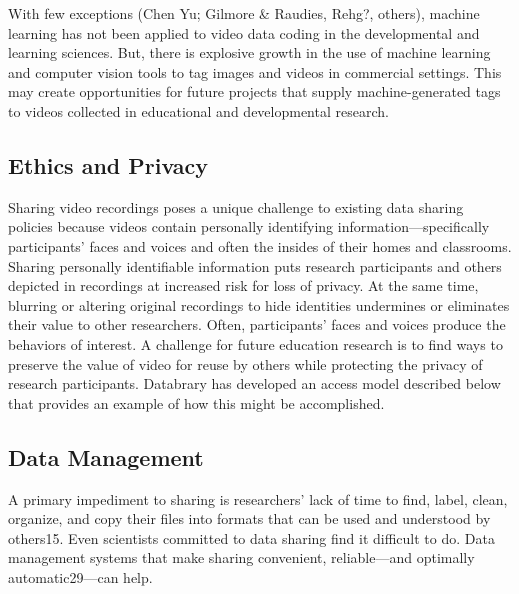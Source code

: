\documentclass[letterpaper,man,natbib]{apa6}
\begin{document}
With few exceptions (Chen Yu; Gilmore \& Raudies, Rehg?, others), machine learning has not been applied to video data coding in the developmental and learning sciences.
But, there is explosive growth in the use of machine learning and computer vision tools to tag images and videos in commercial settings.
This may create opportunities for future projects that supply machine-generated tags to videos collected in educational and developmental research.

\subsection{Ethics and Privacy}

Sharing video recordings poses a unique challenge to existing data sharing policies because videos contain personally identifying information—specifically participants’ faces and voices and often the
insides of their homes and classrooms. 
Sharing personally identifiable information puts research participants and others depicted in recordings at increased risk for loss of privacy. 
At the same time, blurring or altering original recordings to hide identities undermines or eliminates
their value to other researchers. 
Often, participants’ faces and voices produce the behaviors of interest.
A challenge for future education research is to find ways to preserve the value of video for reuse by others while protecting the privacy of research participants.
Databrary has developed an access model described below that provides an example of how this might be accomplished.
\subsection{Data Management}
A primary impediment to sharing is researchers’ lack of time to find, label, clean, organize, and copy their files into formats that can be used and understood by others15. 
Even scientists committed to data sharing find it difficult to do. Data management systems that make sharing convenient, reliable—and optimally automatic29—can help.
\end{document}
